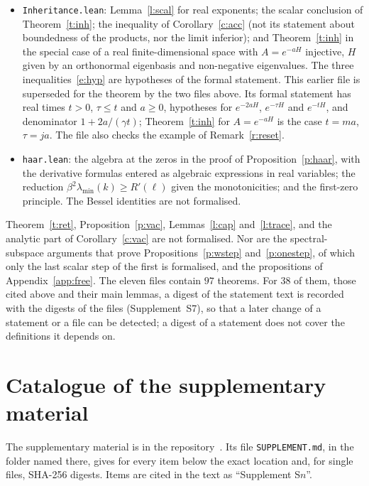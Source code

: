 \begin{itemize}
$v\in D_0$. The proof uses the continuous functional calculus of Mathlib. The passage from the Hamiltonian
$H$ to $S=e^{-\tau H}$ is not formalised. (\texttt{OneSeparation.lean} is an earlier finite-dimensional
version with eigenvalues.)
\item \texttt{Inheritance.lean}: Lemma~\ref{l:scal} for real exponents; the scalar conclusion of
Theorem~\ref{t:inh}; the inequality of Corollary~\ref{c:acc} (not its statement about boundedness of the
products, nor the limit inferior); and Theorem~\ref{t:inh} in the special case of a real finite-dimensional
space with $A=e^{-aH}$ injective, $H$ given by an orthonormal eigenbasis and non-negative eigenvalues. The
three inequalities~\eqref{e:hyp} are hypotheses of the formal statement. This earlier file is superseded for the theorem by the two files above. Its formal statement has real times $t>0$,
$\tau\le t$ and $a\ge0$, hypotheses for $e^{-2aH}$, $e^{-\tau H}$ and $e^{-tH}$, and denominator
$1+2a/(\gamma t)$; Theorem~\ref{t:inh} for $A=e^{-aH}$ is the case $t=ma$, $\tau=ja$. The file also checks the
example of Remark~\ref{r:reset}.
\item \texttt{haar.lean}: the algebra at the zeros in the proof of Proposition~\ref{p:haar}, with the
derivative formulas entered as algebraic expressions in real variables; the reduction
$\beta^2\lambda_{\min}(k)\ge R'(\ell)$ given the monotonicities; and the first-zero principle. The Bessel identities are not
formalised.
\end{itemize}
Theorem~\ref{t:ret}, Proposition~\ref{p:vac}, Lemmas~\ref{l:cap}
and~\ref{l:trace}, and the analytic part of Corollary~\ref{c:vac} are not formalised. Nor are the spectral-subspace arguments that prove
Propositions~\ref{p:wstep} and~\ref{p:onestep}, of which only the last scalar step of the first is
formalised, and the propositions of Appendix~\ref{app:free}.
The eleven files contain $97$ theorems. For $38$ of them, those cited above and their main lemmas, a digest of the statement text is recorded
with the digests of the files (Supplement~S7), so that a later change of a statement or a file can be
detected; a digest of a statement does not cover the definitions it depends on.

\section{Catalogue of the supplementary material}\label{app:supp}
The supplementary material is in the repository~\cite{Supp}. Its file \texttt{SUPPLEMENT.md}, in the folder
named there, gives for every item below the exact location and, for single files, SHA-256 digests. Items are cited
in the text as ``Supplement S$n$''.

